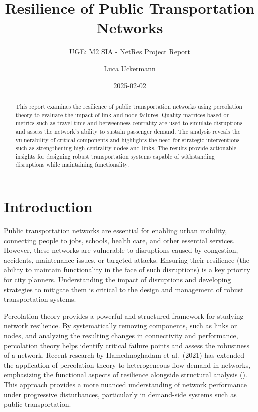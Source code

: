 \documentclass[
  letterpaper,
  DIV=11,
  numbers=noendperiod]{scrartcl}
\title{Resilience of Public Transportation Networks}
\subtitle{UGE: M2 SIA - NetRes Project Report}
\author{Luca Uckermann}
\date{2025-02-02}
\renewcommand*\contentsname{Table of contents}
\newcommand\contentsname{Table of contents}
\begin{document}
\maketitle
\begin{abstract}
This report examines the resilience of public transportation networks
using percolation theory to evaluate the impact of link and node
failures. Quality matrices based on metrics such as travel time and
betweenness centrality are used to simulate disruptions and assess the
network's ability to sustain passenger demand. The analysis reveals the
vulnerability of critical components and highlights the need for
strategic interventions such as strengthening high-centrality nodes and
links. The results provide actionable insights for designing robust
transportation systems capable of withstanding disruptions while
maintaining functionality.
\end{abstract}

\renewcommand*\contentsname{Table of contents}
{
\hypersetup{linkcolor=}
\setcounter{tocdepth}{2}
\tableofcontents
}

\section{Introduction}\label{introduction}

Public transportation networks are essential for enabling urban
mobility, connecting people to jobs, schools, health care, and other
essential services. However, these networks are vulnerable to
disruptions caused by congestion, accidents, maintenance issues, or
targeted attacks. Ensuring their resilience (the ability to maintain
functionality in the face of such disruptions) is a key priority for
city planners. Understanding the impact of disruptions and developing
strategies to mitigate them is critical to the design and management of
robust transportation systems.

Percolation theory provides a powerful and structured framework for
studying network resilience. By systematically removing components, such
as links or nodes, and analyzing the resulting changes in connectivity
and performance, percolation theory helps identify critical failure
points and assess the robustness of a network. Recent research by
Hamedmoghadam et al.~(2021) has extended the application of percolation
theory to heterogeneous flow demand in networks, emphasizing the
functional aspects of resilience alongside structural analysis
(). This approach provides a more nuanced understanding of network
performance under progressive disturbances, particularly in demand-side
systems such as public transportation.
\end{document}
